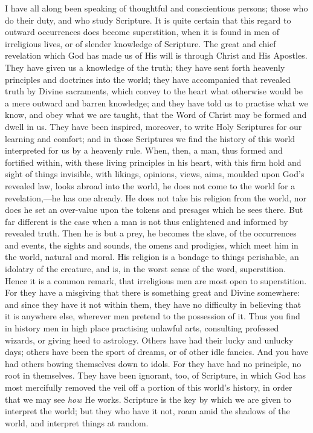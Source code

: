 I have all along been speaking of thoughtful and conscientious
persons; those who do their duty, and who study Scripture. It is quite
certain that this regard to outward occurrences does become
superstition, when it is found in men of irreligious lives, or of
slender knowledge of Scripture. The great and chief revelation which
God has made us of His will is through Christ and His Apostles. They
have given us a knowledge of the truth; they have sent forth heavenly
principles and doctrines into the world; they have accompanied that
revealed truth by Divine sacraments, which convey to the heart what
otherwise would be a mere outward and barren knowledge; and they have
told us to practise what we know, and obey what we are taught, that
the Word of Christ may be formed and dwell in us. They have been
inspired, moreover, to write Holy Scriptures for our learning and
comfort; and in those Scriptures we find the history of this world
interpreted for us by a heavenly rule. When, then, a man, thus formed
and fortified within, with these living principles in his heart, with
this firm hold and sight of things invisible, with likings, opinions,
views, aims, moulded upon God's revealed law, looks abroad into the
world, he does not come to the world for a revelation,—he has one
already. He does not take his religion from the world, nor does he set
an over-value upon the tokens and presages which he sees there. But
far different is the case when a man is not thus enlightened and
informed by revealed truth. Then he is but a prey, he becomes the
slave, of the occurrences and events, the sights and sounds, the omens
and prodigies, which meet him in the world, natural and moral. His
religion is a bondage to things perishable, an idolatry of the
creature, and is, in the worst sense of the word, superstition. Hence
it is a common remark, that irreligious men are most open to
superstition. For they have a misgiving that there is something great
and Divine somewhere: and since they have it not within them, they
have no difficulty in believing that it is anywhere else, wherever men
pretend to the possession of it. Thus you find in history men in high
place practising unlawful arts, consulting professed wizards, or
giving heed to astrology. Others have had their lucky and unlucky
days; others have been the sport of dreams, or of other idle fancies.
And you have had others bowing themselves down to idols. For they have
had no principle, no root in themselves. They have been ignorant, too,
of Scripture, in which God has most mercifully removed the veil off a
portion of this world's history, in order that we may see \emph{how}
He works. Scripture is the key by which we are given to interpret the
world; but they who have it not, roam amid the shadows of the world,
and interpret things at random.

